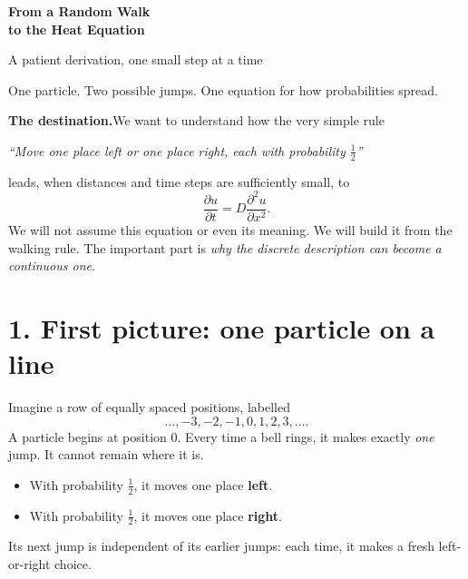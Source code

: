 \documentclass[11pt,a4paper]{article}
\begin{document}
\begin{center}
{\fontsize{23}{27}\selectfont\bfseries\color{ink} From a Random Walk\\[3pt]to the Heat Equation}\par
\vspace{8pt}
{\large\color{blue} A patient derivation, one small step at a time}\par
\vspace{9pt}
{\small\color{muted} One particle. Two possible jumps. One equation for how probabilities spread.}
\end{center}
\vspace{3pt}
\begin{takeaway}
\textbf{The destination.}\quad We want to understand how the very simple rule
\begin{center}
\emph{``Move one place left or one place right, each with probability $\tfrac12$''}
\end{center}
leads, when distances and time steps are sufficiently small, to
\[
\boxed{\displaystyle \frac{\partial u}{\partial t}=D\frac{\partial^2u}{\partial x^2}.}
\]
We will not assume this equation or even its meaning. We will build it from the walking rule. The important part is \emph{why the discrete description can become a continuous one}.
\end{takeaway}

\section{1. First picture: one particle on a line}
Imagine a row of equally spaced positions, labelled
\[
\ldots,-3,-2,-1,0,1,2,3,\ldots.
\]
A particle begins at position $0$. Every time a bell rings, it makes exactly \emph{one} jump. It cannot remain where it is.
\begin{itemize}[leftmargin=20pt,itemsep=2pt,topsep=2pt]
\item With probability $\tfrac12$, it moves one place \textbf{left}.
\item With probability $\tfrac12$, it moves one place \textbf{right}.
\end{itemize}
Its next jump is independent of its earlier jumps: each time, it makes a fresh left-or-right choice.

\begin{center}
\end{center}
\end{document}
